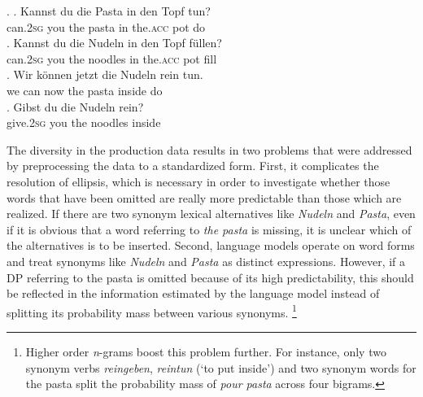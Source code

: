 \ex. \ag. Kannst du die Pasta in den Topf tun?\\
can.\textsc{2sg} you the pasta in the.\textsc{acc} pot do\\
\bg. Kannst du die Nudeln in den Topf füllen?\\
can.\textsc{2sg} you the noodles in the.\textsc{acc} pot fill\\
\cg. Wir können jetzt die Nudeln rein tun.\\
we can now the pasta inside do\\
\dg. Gibst du die Nudeln rein?\\
give.\textsc{2sg} you the noodles inside\\

The diversity in the production data results in two problems that were addressed by preprocessing the data to a standardized form. First, it complicates the resolution of ellipsis, which is necessary in order to investigate whether those words that have been omitted are really more predictable than those which are realized. If there are two synonym lexical alternatives like \textit{Nudeln} and \textit{Pasta}, even if it is obvious that a word referring to \textit{the pasta} is missing, it is unclear which of the alternatives is to be inserted. Second, language models operate on word forms and treat synonyms like \textit{Nudeln} and \textit{Pasta} as distinct expressions. However, if a DP referring to the pasta is omitted because of its high predictability, this should be reflected in the information estimated by the language model instead of splitting its probability mass between various synonyms.%
%
\footnote{Higher order \textit{n}-grams boost this problem further. For instance, only two synonym verbs \textit{reingeben}, \textit{reintun} (`to put inside') and two synonym words for the pasta split the probability mass of \textit{pour pasta} across four bigrams.}\afterfn%
%

